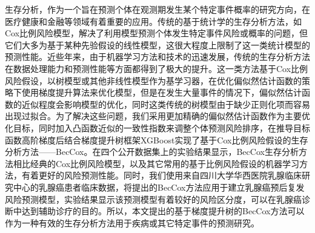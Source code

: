 	
\begin{chineseabstract}
生存分析，作为一个旨在预测个体在观测期发生某个特定事件概率的研究方向，在医疗健康和金融等领域有着重要的应用。传统的基于统计学的生存分析方法，如Cox比例风险模型，解决了利用模型预测个体发生特定事件风险或概率的问题，但它们大多为基于某种先验假设的线性模型，这很大程度上限制了这一类统计模型的预测性能。近些年来，由于机器学习方法和技术的迅速发展，传统的生存分析方法在数据处理能力和预测性能等方面都得到了极大的提升。这一类方法基于Cox比例风险假设，以树模型或其他非线性模型作为基学习器，在优化偏似然估计函数的策略下使用梯度提升算法来优化模型，但是在发生大量事件的情况下，偏似然估计函数的近似程度会影响模型的优化，同时这类传统的树模型由于缺少正则化项而容易出现过拟合。为了解决这些问题，我们采用更加精确的偏似然估计函数作为主要优化目标，同时加入凸函数近似的一致性指数来调整个体预测风险排序，在推导目标函数高阶梯度后结合梯度提升树框架XGBoost实现了基于Cox比例风险假设的生存分析方法——BecCox。在四个公开数据集上的实验结果显示，BecCox生存分析方法相比经典的Cox比例风险模型，以及其它常用的基于比例风险假设的机器学习方法，有着更好的风险预测性能。同时，我们使用来自四川大学华西医院乳腺临床研究中心的乳腺癌患者临床数据，将提出的BecCox方法应用于建立乳腺癌预后复发风险预测模型，实验结果显示该预测模型有着较好的风险区分度，可以在乳腺癌诊断中达到辅助诊疗的目的。所以，本文提出的基于梯度提升树的BecCox方法可以作为一种有效的生存分析方法用于疾病或其它特定事件的预测研究。

\end{chineseabstract}

